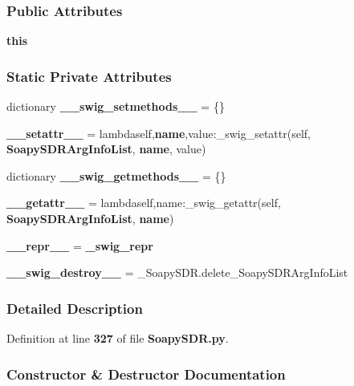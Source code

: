 \subsubsection*{Public Attributes}
\begin{DoxyCompactItemize}
\item 
{\bf this}
\end{DoxyCompactItemize}
\subsubsection*{Static Private Attributes}
\begin{DoxyCompactItemize}
\item 
dictionary {\bf \+\_\+\+\_\+swig\+\_\+setmethods\+\_\+\+\_\+} = \{\}
\item 
{\bf \+\_\+\+\_\+setattr\+\_\+\+\_\+} = lambdaself,{\bf name},value\+:\+\_\+swig\+\_\+setattr(self, {\bf Soapy\+S\+D\+R\+Arg\+Info\+List}, {\bf name}, value)
\item 
dictionary {\bf \+\_\+\+\_\+swig\+\_\+getmethods\+\_\+\+\_\+} = \{\}
\item 
{\bf \+\_\+\+\_\+getattr\+\_\+\+\_\+} = lambdaself,name\+:\+\_\+swig\+\_\+getattr(self, {\bf Soapy\+S\+D\+R\+Arg\+Info\+List}, {\bf name})
\item 
{\bf \+\_\+\+\_\+repr\+\_\+\+\_\+} = {\bf \+\_\+swig\+\_\+repr}
\item 
{\bf \+\_\+\+\_\+swig\+\_\+destroy\+\_\+\+\_\+} = \+\_\+\+Soapy\+S\+D\+R.\+delete\+\_\+\+Soapy\+S\+D\+R\+Arg\+Info\+List
\end{DoxyCompactItemize}


\subsubsection{Detailed Description}


Definition at line {\bf 327} of file {\bf Soapy\+S\+D\+R.\+py}.



\subsubsection{Constructor \& Destructor Documentation}
